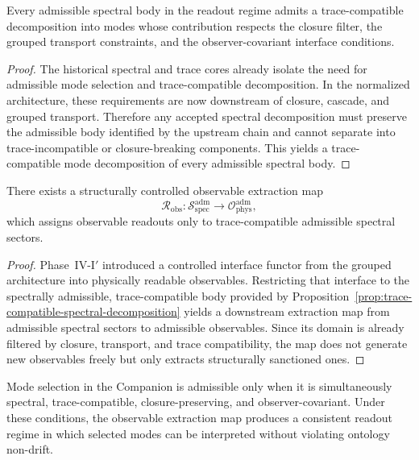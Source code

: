 \begin{proposition}
\label{prop:trace-compatible-spectral-decomposition}
Every admissible spectral body in the readout regime admits a trace-compatible decomposition into modes whose contribution respects the closure filter, the grouped transport constraints, and the observer-covariant interface conditions.
\end{proposition}

\begin{proof}
The historical spectral and trace cores already isolate the need for admissible mode selection and trace-compatible decomposition. In the normalized architecture, these requirements are now downstream of closure, cascade, and grouped transport. Therefore any accepted spectral decomposition must preserve the admissible body identified by the upstream chain and cannot separate into trace-incompatible or closure-breaking components. This yields a trace-compatible mode decomposition of every admissible spectral body.
\end{proof}

\begin{proposition}
\label{prop:observable-extraction-map}
There exists a structurally controlled observable extraction map
\[
\mathcal R_{\mathrm{obs}}: \mathcal S_{\mathrm{spec}}^{\mathrm{adm}} \longrightarrow \mathcal O_{\mathrm{phys}}^{\mathrm{adm}},
\]
which assigns observable readouts only to trace-compatible admissible spectral sectors.
\end{proposition}

\begin{proof}
Phase~IV-I$'$ introduced a controlled interface functor from the grouped architecture into physically readable observables. Restricting that interface to the spectrally admissible, trace-compatible body provided by Proposition~\ref{prop:trace-compatible-spectral-decomposition} yields a downstream extraction map from admissible spectral sectors to admissible observables. Since its domain is already filtered by closure, transport, and trace compatibility, the map does not generate new observables freely but only extracts structurally sanctioned ones.
\end{proof}

\begin{theorem}
\label{thm:mode-selection-observable-consistency}
Mode selection in the Companion is admissible only when it is simultaneously spectral, trace-compatible, closure-preserving, and observer-covariant. Under these conditions, the observable extraction map produces a consistent readout regime in which selected modes can be interpreted without violating ontology non-drift.
\end{theorem}

